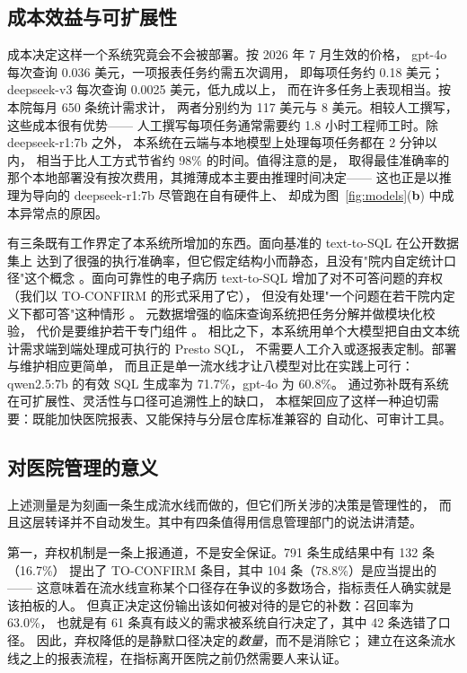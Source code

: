 \documentclass[11pt,a4paper]{article}
\begin{document}
\subsection{成本效益与可扩展性}
成本决定这样一个系统究竟会不会被部署。按 2026 年 7 月生效的价格，
gpt-4o 每次查询 0.036 美元，一项报表任务约需五次调用，
即每项任务约 0.18 美元；deepseek-v3 每次查询 0.0025 美元，低九成以上，
而在许多任务上表现相当。按本院每月 650 条统计需求计，
两者分别约为 117 美元与 8 美元。相较人工撰写，这些成本很有优势——
人工撰写每项任务通常需要约 1.8 小时工程师工时。除 deepseek-r1:7b 之外，
本系统在云端与本地模型上处理每项任务都在 2 分钟以内，
相当于比人工方式节省约 98\% 的时间。值得注意的是，
取得最佳准确率的那个本地部署没有按次费用，其摊薄成本主要由推理时间决定——
这也正是以推理为导向的 deepseek-r1:7b 尽管跑在自有硬件上、
却成为图~\ref{fig:models}(\textbf{b}) 中成本异常点的原因。

有三条既有工作界定了本系统所增加的东西。面向基准的 text-to-SQL 在公开数据集上
达到了很强的执行准确率，但它假定结构小而静态，且没有"院内自定统计口径"这个概念
\cite{yu2018,guo2019,bogin2019,tsqlsurvey2024}。面向可靠性的电子病历 text-to-SQL
增加了对不可答问题的弃权（我们以 TO-CONFIRM 的形式采用了它），
但没有处理"一个问题在若干院内定义下都可答"这种情形 \cite{ehrsql2024}。
元数据增强的临床查询系统把任务分解并做模块化校验，
代价是要维护若干专门组件 \cite{metaclin2025,sqlthought2025}。
相比之下，本系统用单个大模型把自由文本统计需求端到端处理成可执行的 Presto SQL，
不需要人工介入或逐报表定制。部署与维护相应更简单，
而且正是单一流水线才让八模型对比在实践上可行：
qwen2.5:7b 的有效 SQL 生成率为 71.7\%，gpt-4o 为 60.8\%。
通过弥补既有系统在可扩展性、灵活性与口径可追溯性上的缺口，
本框架回应了这样一种迫切需要：既能加快医院报表、又能保持与分层仓库标准兼容的
自动化、可审计工具。

\subsection{对医院管理的意义}\label{sec:cn-mgmt}
上述测量是为刻画一条生成流水线而做的，但它们所关涉的决策是管理性的，
而且这层转译并不自动发生。其中有四条值得用信息管理部门的说法讲清楚。

第一，弃权机制是一条上报通道，不是安全保证。791 条生成结果中有 132 条（16.7\%）
提出了 TO-CONFIRM 条目，其中 104 条（78.8\%）是应当提出的——
这意味着在流水线宣称某个口径存在争议的多数场合，指标责任人确实就是该拍板的人。
但真正决定这份输出该如何被对待的是它的补数：召回率为 63.0\%，
也就是有 61 条真有歧义的需求被系统自行决定了，其中 42 条选错了口径。
因此，弃权降低的是静默口径决定的\emph{数量}，而不是消除它；
建立在这条流水线之上的报表流程，在指标离开医院之前仍然需要人来认证。
\end{document}
